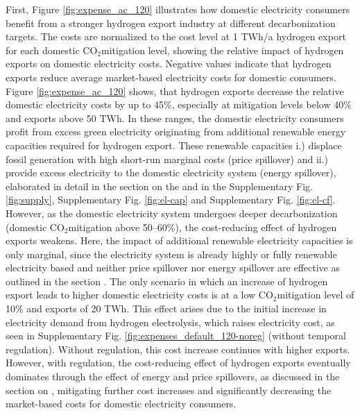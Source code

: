 \documentclass[5p,numafflabel]{elsarticle}
\newcommand{\co}{\ce{CO2}~}
\def\co{CO${}_2${\:}}
\begin{document}
First, Figure \ref{fig:expense_ac_120} illustrates how domestic electricity consumers benefit from a stronger hydrogen export industry at different decarbonization targets. The costs are normalized to the cost level at 1 TWh/a hydrogen export for each domestic \co mitigation level, showing the relative impact of hydrogen exports on domestic electricity costs. Negative values indicate that hydrogen exports reduce average market-based electricity costs for domestic consumers.
Figure \ref{fig:expense_ac_120} shows, that hydrogen exports decrease the relative domestic electricity costs by up to 45\%, especially at mitigation levels below 40\% and exports above 50 TWh. 
In these ranges, the domestic electricity consumers profit from excess green electricity originating from additional renewable energy capacities required for hydrogen export. These renewable capacities i.) displace fossil generation with high short-run marginal costs (price spillover) and ii.) provide excess electricity to the domestic electricity system (energy spillover), elaborated in detail in the section on the  and in the Supplementary Fig. \ref{fig:supply}, Supplementary Fig. \ref{fig:el-cap} and Supplementary Fig. \ref{fig:el-cf}.
However, as the domestic electricity system undergoes deeper decarbonization (domestic \co mitigation above 50--60\%), the cost-reducing effect of hydrogen exports weakens. Here, the impact of additional renewable electricity capacities is only marginal, since the electricity system is already highly or fully renewable electricity based and neither price spillover nor energy spillover are effective as outlined in the section .
The only scenario in which an increase of hydrogen export leads to higher domestic electricity costs is at a low \co mitigation level of 10\% and exports of 20 TWh.
This effect arises due to the initial increase in electricity demand from hydrogen electrolysis, which raises electricity cost, as seen in Supplementary Fig. \ref{fig:expenses_default_120-noreg} (without temporal regulation). Without regulation, this cost increase continues with higher exports. However, with regulation, the cost-reducing effect of hydrogen exports eventually dominates through the effect of energy and price spillovers, as discussed in the section on , mitigating further cost increases and significantly decreasing the market-based costs for domestic electricity consumers.
\end{document}
